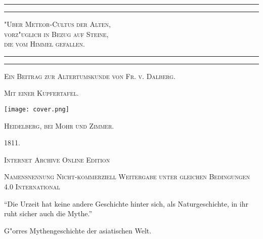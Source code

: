 \documentclass[a4paper, 11pt, oneside, polutonikogreek, german]{article}
\begin{document}
\begin{titlepage} %
	\centering %

	
	\rule{\textwidth}{1.6pt}\vspace*{-\baselineskip}\vspace*{2pt} %
	\rule{\textwidth}{0.4pt} %
	
	{\scshape\LARGE "Uber Meteor-Cultus der Alten,\\[1.25pt] vorz"uglich in Bezug auf Steine,\\[1.25pt] die vom Himmel gefallen.\\[1.25pt]}
	
	\rule{\textwidth}{0.4pt}\vspace*{-\baselineskip}\vspace{3.2pt} %
	\rule{\textwidth}{1.6pt} %

	
	{\scshape Ein Beitrag zur Altertumskunde von Fr. v. Dalberg.} %
	
    {\scshape\scriptsize Mit einer Kupfertafel.} %
    
	
	\texttt{[image: cover.png]}
	
    \vspace*{\fill}

	\vspace{1\baselineskip}

	{\small\scshape Heidelberg, bei Mohr und Zimmer.}
	
	{\small\scshape{1811.}}
	
	\vspace{0.5\baselineskip} %

    \scshape Internet Archive Online Edition  %
	
	{\scshape\small Namensnennung Nicht-kommerziell Weitergabe unter gleichen Bedingungen 4.0 International} %
\end{titlepage}
\setlength{\parskip}{1mm plus1mm minus1mm}
\clearpage
\vspace*{\fill}
\begin{center}
"`Die Urzeit hat keine andere Geschichte hinter sich, als Naturgeschichte, in ihr ruht sicher auch die Mythe."'
\end{center}
\begin{center}
G"orres Mythengeschichte der asiatischen Welt.
\end{center}
\vspace*{\fill}
\clearpage
\end{document}
